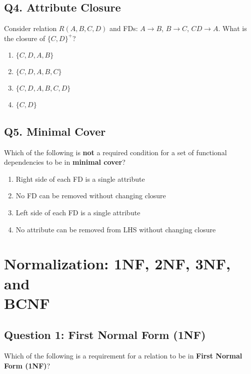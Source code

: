 \vspace{1em}

\subsection*{Q4. Attribute Closure}
Consider relation $R(A, B, C, D)$ and FDs: $A \rightarrow B$, $B \rightarrow C$, $CD \rightarrow A$. What is the closure of $\{C, D\}^+$?

\begin{enumerate}[label=(\alph*)]
    \item $\{C, D, A, B\}$
    \item $\{C, D, A, B, C\}$
    \item $\{C, D, A, B, C, D\}$
    \item $\{C, D\}$
\end{enumerate}

\vspace{1em}

\subsection*{Q5. Minimal Cover}
Which of the following is \textbf{not} a required condition for a set of functional dependencies to be in \textbf{minimal cover}?

\begin{enumerate}[label=(\alph*)]
    \item Right side of each FD is a single attribute
    \item No FD can be removed without changing closure
    \item Left side of each FD is a single attribute
    \item No attribute can be removed from LHS without changing closure
\end{enumerate}


\section[Normalization: 1NF, 2NF, 3NF, and BCNF]
{Normalization: 1NF, 2NF, 3NF, and\\ BCNF}

\subsection*{Question 1: First Normal Form (1NF)}
Which of the following is a requirement for a relation to be in \textbf{First Normal Form (1NF)}?

